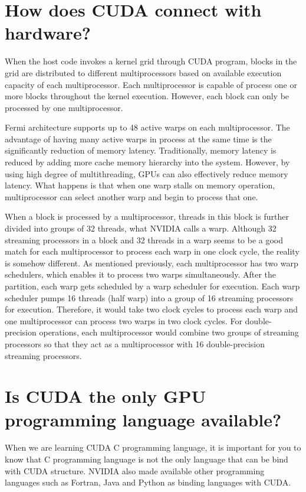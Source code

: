 \documentclass[letterpaper,10pt,openany,oneside]{sphinxmanual}
\begin{document}
\section{How does CUDA connect with hardware?}
\label{Introduction/Introduction:understanding-the-cuda-data-parallel-threading-model-a-primer}\label{Introduction/Introduction:how-does-cuda-connect-with-hardware}
When the host code invokes a kernel grid through CUDA program, blocks in the grid are distributed to different multiprocessors based on available execution capacity of each multiprocessor. Each multiprocessor is capable of process one or more blocks throughout the kernel execution. However, each block can only be processed by one multiprocessor.

Fermi architecture supports up to 48 active warps on each multiprocessor. The advantage of having many active warps in process at the same time is the significantly reduction of memory latency. Traditionally, memory latency is reduced by adding more cache memory hierarchy into the system. However, by using high degree of multithreading, GPUs can also effectively reduce memory latency. What happens is that when one warp stalls on memory operation, multiprocessor can select another warp and begin to process that one.

When a block is processed by a multiprocessor, threads in this block is further divided into groups of 32 threads, what NVIDIA calls a warp. Although 32 streaming processors in a block and 32 threads in a warp seems to be a good match for each multiprocessor to process each warp in one clock cycle, the reality is somehow different. As mentioned previously, each multiprocessor has two warp schedulers, which enables it to process two warps simultaneously. After the partition, each warp gets scheduled by a warp scheduler for execution. Each warp scheduler pumps 16 threads (half warp) into a group of 16 streaming processors for execution. Therefore, it would take two clock cycles to process each warp and one multiprocessor can process two warps in two clock cycles. For double-precision operations, each multiprocessor would combine two groups of streaming processors so that they act as a multiprocessor with 16 double-precision streaming processors.


\section{Is CUDA the only GPU programming language available?}
\label{Introduction/Introduction:is-cuda-the-only-gpu-programming-language-available}
When we are learning CUDA C programming language, it is important for you to know that C programming language is not the only language that can be bind with CUDA structure. NVIDIA also made available other programming languages such as Fortran, Java and Python as binding languages with CUDA.
\end{document}

